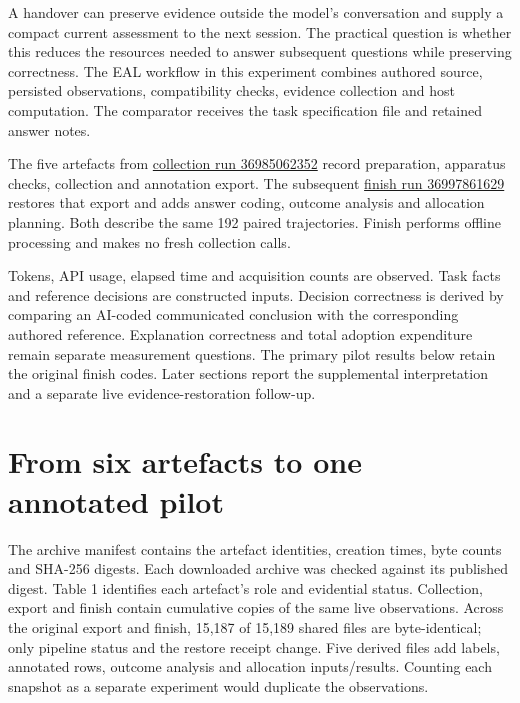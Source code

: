\documentclass[preprint,11pt]{elsarticle}
\begin{document}
A handover can preserve evidence outside the model's conversation and
supply a compact current assessment to the next session. The practical
question is whether this reduces the resources needed to answer
subsequent questions while preserving correctness. The EAL workflow in
this experiment combines authored source, persisted observations,
compatibility checks, evidence collection and host computation. The
comparator receives the task specification file and retained answer
notes.

The five artefacts from
\href{https://github.com/emmett08/earl/actions/runs/36985062352}{collection
run 36985062352} record preparation, apparatus checks, collection and
annotation export. The subsequent
\href{https://github.com/emmett08/earl/actions/runs/36997861629}{finish
run 36997861629} restores that export and adds answer coding, outcome
analysis and allocation planning. Both describe the same 192 paired
trajectories. Finish performs offline processing and makes no fresh
collection calls.

Tokens, API usage, elapsed time and acquisition counts are observed.
Task facts and reference decisions are constructed inputs. Decision
correctness is derived by comparing an AI-coded communicated conclusion
with the corresponding authored reference. Explanation correctness and
total adoption expenditure remain separate measurement questions. The
primary pilot results below retain the original finish codes. Later
sections report the supplemental interpretation and a separate live
evidence-restoration follow-up.

\FloatBarrier

\hypertarget{from-six-artefacts-to-one-annotated-pilot}{%
\section{From six artefacts to one annotated
pilot}\label{from-six-artefacts-to-one-annotated-pilot}}

The archive manifest contains the artefact identities, creation times,
byte counts and SHA-256 digests. Each downloaded archive was checked
against its published digest. Table 1 identifies each artefact's role
and evidential status. Collection, export and finish contain cumulative
copies of the same live observations. Across the original export and
finish, 15,187 of 15,189 shared files are byte-identical; only pipeline
status and the restore receipt change. Five derived files add labels,
annotated rows, outcome analysis and allocation inputs/results. Counting
each snapshot as a separate experiment would duplicate the observations.
\end{document}
